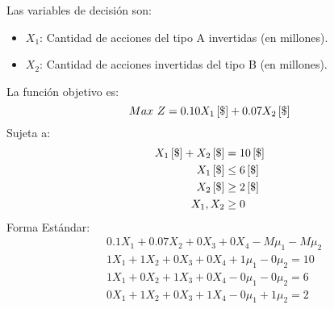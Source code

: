 \documentclass{tarea}
\begin{document}
\begin{homeworkProblem}[-1][Lotería]
Las variables de decisión son:
\begin{itemize}
	\item $X_1$: Cantidad de acciones del tipo A invertidas (en millones).
	\item $X_2$: Cantidad de acciones invertidas del tipo B (en millones).
\end{itemize}
La función objetivo es: 
\begin{equation}
	Max\ Z = 0.10X_1\left[ \$ \right] + 0.07X_2\left[ \$ \right]
\end{equation}
Sujeta a:
\begin{align*}
	X_1\left[ \$ \right]+X_2\left[ \$ \right] &= 10\left[ \$ \right] \\
	X_1\left[ \$ \right] &\le 6\left[ \$ \right] \\
	X_2\left[ \$ \right] &\ge 2\left[ \$ \right] \\
	X_1,X_2 &\ge 0
\end{align*}
Forma Estándar:
\begin{align*}
&0.1X_1 + 0.07X_2 + 0X_3 + 0X_4 - M\mu_1 - M\mu_2 \\
&1X_1 +1X_2 + 0X_3 + 0X_4 + 1\mu_1 - 0\mu_2 = 10 \\
&1X_1 + 0X_2 + 1X_3 + 0X_4 - 0\mu_1 - 0\mu_2 = 6\\
&0X_1 + 1X_2 + 0X_3 + 1X_4 - 0\mu_1 + 1\mu_2 = 2\\
\end{align*}
\end{homeworkProblem}
\end{document}
